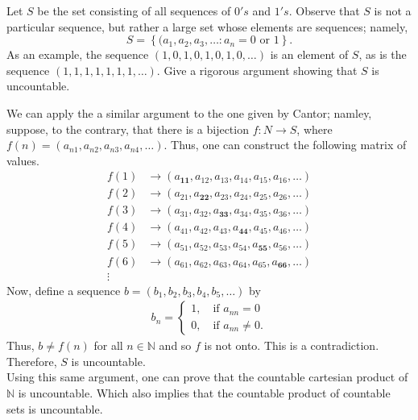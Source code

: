 \documentclass[12pt]{article}
\newcommand{\N}{\mathbb{N}}
\newenvironment{problem}[2][Problem]{\begin{trivlist} \item[\hskip \labelsep {\bfseries #1}\hskip \labelsep {\bfseries #2.}]}{\end{trivlist}}
\newenvironment{solution}[2][Solution]{\begin{trivlist} \item[\hskip \labelsep {\bfseries #1}\hskip \labelsep {\bfseries #2.}]}{\end{trivlist}}
\begin{document}
\begin{problem}{1.6.4}
  Let $S$ be the set consisting of all sequences of $0's$ and $1's$. Observe that $S$ is not a particular sequence, but rather a large set whose elements are sequences; namely,
  \begin{equation*}
    S=\left\{(a_{1},a_{2},a_{3},\dots:a_{n}=0 \text{ or }1\right\}.
  \end{equation*}
  As an example, the sequence $(1,0,1,0,1,0,1,0,\dots)$ is an element of $S$, as is the sequence $(1,1,1,1,1,1,1,\dots)$. Give a rigorous argument showing that $S$ is uncountable.
  \begin{solution}{1.6.4}
    We can apply the a similar argument to the one given by Cantor; namley, 
    suppose, to the contrary, that there is a bijection $f:N\to S$, where $f(n) = (a_{n1},a_{n2},a_{n3},a_{n4},\dots)$. Thus, one can construct the following matrix of values.
    \begin{align*}
      f(1) &\to (a_{\mathbf{11}},a_{12},a_{13},a_{14},a_{15},a_{16},\dots)\\
      f(2) &\to (a_{21},a_{\mathbf{22}},a_{23},a_{24},a_{25},a_{26},\dots)\\
      f(3) &\to (a_{31},a_{32},a_{\mathbf{33}},a_{34},a_{35},a_{36},\dots)\\
      f(4) &\to  (a_{41},a_{42},a_{43},a_{\mathbf{44}},a_{45},a_{46},\dots)\\
      f(5) &\to (a_{51},a_{52},a_{53},a_{54},a_{\mathbf{55}},a_{56},\dots)\\
      f(6) &\to (a_{61},a_{62},a_{63},a_{64},a_{65},a_{\mathbf{66}},\dots)\\
      \vdots
    \end{align*}
    Now, define a sequence $b=(b_{1},b_{2},b_{3},b_{4},b_{5},\dots)$ by
    \begin{align*}
      b_{n} = \begin{cases}
	1, \quad \text{if } a_{nn} = 0\\
	0, \quad \text{if } a_{nn} \neq 0.
      \end{cases}
      \end{align*}
      Thus, $b\neq f(n)$ for all $n\in \N$ and so $f$ is not onto. This is a contradiction. Therefore, $S$ is uncountable. \\
      Using this same argument, one can prove that the countable cartesian product of $\N$ is uncountable. Which also implies that the countable product of countable sets is uncountable.  
      
  \end{solution}
\end{problem}
\end{document}
